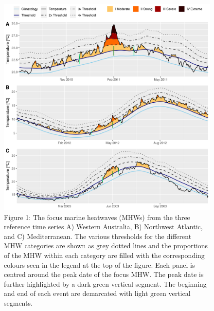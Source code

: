 \documentclass[]{article}
\begin{document}
\begin{figure}
\centering
\includegraphics{../LaTeX/fig_1.png}
\caption{Figure 1: The focus marine heatwaves (MHWs) from the three
reference time series A) Western Australia, B) Northwest Atlantic, and
C) Mediterranean. The various thresholds for the different MHW
categories are shown as grey dotted lines and the proportions of the MHW
within each category are filled with the corresponding colours seen in
the legend at the top of the figure. Each panel is centred around the
peak date of the focus MHW. The peak date is further highlighted by a
dark green vertical segment. The beginning and end of each event are
demarcated with light green vertical segments.}
\end{figure}
\end{document}
